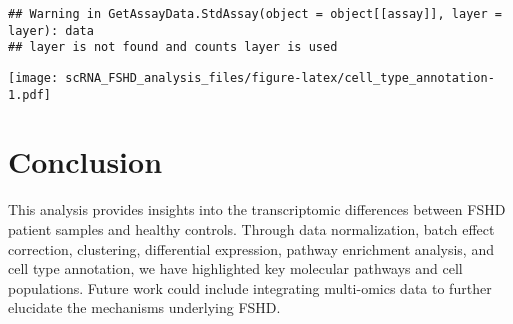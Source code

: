 \documentclass[
]{article}
\newenvironment{Shaded}{\begin{snugshade}}{\end{snugshade}}
\newcommand{\AttributeTok}[1]{\textcolor[rgb]{0.13,0.29,0.53}{#1}}
\newcommand{\CommentTok}[1]{\textcolor[rgb]{0.56,0.35,0.01}{\textit{#1}}}
\newcommand{\FunctionTok}[1]{\textcolor[rgb]{0.13,0.29,0.53}{\textbf{#1}}}
\newcommand{\NormalTok}[1]{#1}
\newcommand{\OtherTok}[1]{\textcolor[rgb]{0.56,0.35,0.01}{#1}}
\newcommand{\SpecialCharTok}[1]{\textcolor[rgb]{0.81,0.36,0.00}{\textbf{#1}}}
\newcommand{\StringTok}[1]{\textcolor[rgb]{0.31,0.60,0.02}{#1}}
\begin{document}
\begin{verbatim}
## Warning in GetAssayData.StdAssay(object = object[[assay]], layer = layer): data
## layer is not found and counts layer is used
\end{verbatim}

\begin{Shaded}
\end{Shaded}

\texttt{[image: scRNA\_FSHD\_analysis\_files/figure-latex/cell\_type\_annotation-1.pdf]}

\section{Conclusion}\label{conclusion}

This analysis provides insights into the transcriptomic differences
between FSHD patient samples and healthy controls. Through data
normalization, batch effect correction, clustering, differential
expression, pathway enrichment analysis, and cell type annotation, we
have highlighted key molecular pathways and cell populations. Future
work could include integrating multi-omics data to further elucidate the
mechanisms underlying FSHD.
\end{document}

